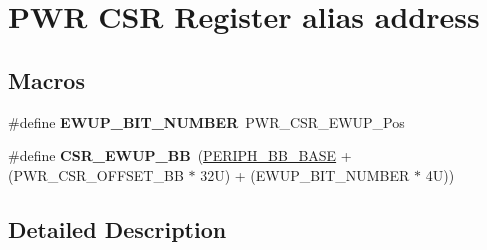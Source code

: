 \hypertarget{group___p_w_r___c_s_r__register__alias}{}\section{P\+WR C\+SR Register alias address}
\label{group___p_w_r___c_s_r__register__alias}
\subsection*{Macros}
\begin{DoxyCompactItemize}
\item 
\mbox{\label{group___p_w_r___c_s_r__register__alias_gae006999c3cf61de12915df07eadb50f9}} 
\#define {\bfseries E\+W\+U\+P\+\_\+\+B\+I\+T\+\_\+\+N\+U\+M\+B\+ER}~P\+W\+R\+\_\+\+C\+S\+R\+\_\+\+E\+W\+U\+P\+\_\+\+Pos
\item 
\mbox{\label{group___p_w_r___c_s_r__register__alias_gaaff864595f697850b19173b0bca991b0}} 
\#define {\bfseries C\+S\+R\+\_\+\+E\+W\+U\+P\+\_\+\+BB}~(\mbox{\hyperlink{group___peripheral__memory__map_gaed7efc100877000845c236ccdc9e144a}{P\+E\+R\+I\+P\+H\+\_\+\+B\+B\+\_\+\+B\+A\+SE}} + (P\+W\+R\+\_\+\+C\+S\+R\+\_\+\+O\+F\+F\+S\+E\+T\+\_\+\+BB $\ast$ 32\+U) + (\+E\+W\+U\+P\+\_\+\+B\+I\+T\+\_\+\+N\+U\+M\+B\+E\+R $\ast$ 4\+U))
\end{DoxyCompactItemize}


\subsection{Detailed Description}
